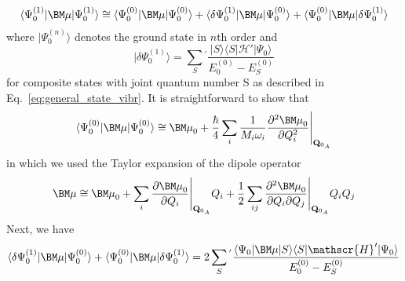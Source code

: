 %
\begin{equation}
\langle \Psi_0^{(1)} \vert {\BM \mu} \vert \Psi_0^{(1)} \rangle \cong 
\langle \Psi_0^{(0)} \vert {\BM \mu} \vert \Psi_0^{(0)} \rangle
+
\langle \delta \Psi_0^{(1)} \vert {\BM \mu} \vert \Psi_0^{(0)} \rangle
+
\langle \Psi_0^{(0)} \vert {\BM \mu} \vert \delta \Psi_0^{(1)} \rangle
\end{equation}
%
where $\vert \Psi_0^{(n)} \rangle$ denotes the ground state in $n$th order
and 
%
\begin{equation}
\vert \delta \Psi_0^{(1)} \rangle = \sum_S{^{'}} \frac{
\vert S \rangle \langle S \vert \mathscr{H}' \vert \Psi_0 \rangle 
}{E^{(0)}_0 - E^{(0)}_S}
\end{equation}
% 
for composite states with joint quantum number S as described in Eq.~\eqref{eq:general_state_vibr}.
It is straightforward to show that
%
\begin{equation}
\langle \Psi_0^{(0)} \vert {\BM \mu} \vert \Psi_0^{(0)} \rangle \cong 
{\BM \mu}_0 + \frac{\hbar}{4}\sum_i \frac{1}{M_i\omega_i} 
             \frac{\partial^2 {\BM \mu}_0 }{\partial Q_i^2} \Bigg|_{{\bf Q}_{0_A}}
\end{equation}
%
in which we used the Taylor expansion of the dipole operator
%
\begin{equation}
{\BM \mu} \cong {\BM \mu}_0 + \sum_i \frac{\partial {\BM \mu}_0 }{\partial Q_i} \Bigg|_{{\bf Q}_{0_A}} Q_i
 + \frac{1}{2} \sum_{ij} \frac{\partial^2 {\BM \mu}_0 }{\partial Q_i \partial Q_j} \Bigg|_{{\bf Q}_{0_A}} Q_i Q_j
\end{equation}
%
Next, we have
%
\begin{equation}
\langle \delta \Psi_0^{(1)} \vert {\BM \mu} \vert \Psi_0^{(0)} \rangle
+
\langle \Psi_0^{(0)} \vert {\BM \mu} \vert \delta \Psi_0^{(1)} \rangle =
2
 \sum_S{^{'}} \frac{
\langle \Psi_0 \vert {\BM \mu} \vert S \rangle \langle S \vert \mathscr{H}' \vert \Psi_0 \rangle 
}{E^{(0)}_0 - E^{(0)}_S}
\end{equation}
%




